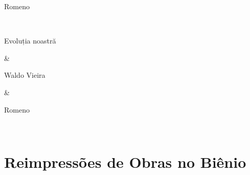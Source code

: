 \documentclass{gescons}
\begin{document}
\begin{longtable}[]
\begin{minipage}[b]{\linewidth}
Romeno
\end{minipage} \\
\hline
\begin{minipage}[b]{\linewidth}\raggedright
Evoluția noastră
\end{minipage} & \begin{minipage}[b]{\linewidth}\raggedright
Waldo Vieira
\end{minipage} & \begin{minipage}[b]{\linewidth}\raggedright
Romeno
\end{minipage} \\
\midrule\noalign{}
\endhead
\bottomrule\noalign{}
\endlastfoot
\end{longtable}

\clearpage
{}
\section*{Reimpressões de Obras no Biênio}
\end{document}
